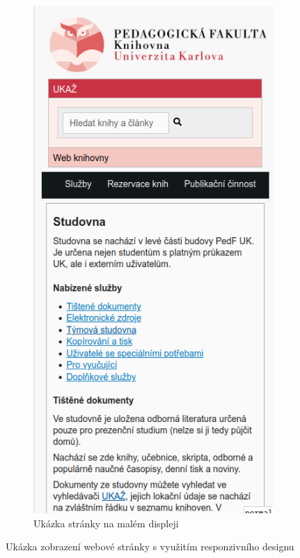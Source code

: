 \documentclass{csbulletin}
\begin{document}
\begin{figure}[tbp]
\begin{subfigure}[t]{0.24\textwidth}
    \includegraphics[width=\textwidth]{img/pedf-web-small.png}
    \caption{Ukázka stránky na malém displeji}
\end{subfigure}
  \caption{Ukázka zobrazení webové stránky s využitím responzivního designu}\label{fig:responzivni}
\end{figure}
\end{document}
